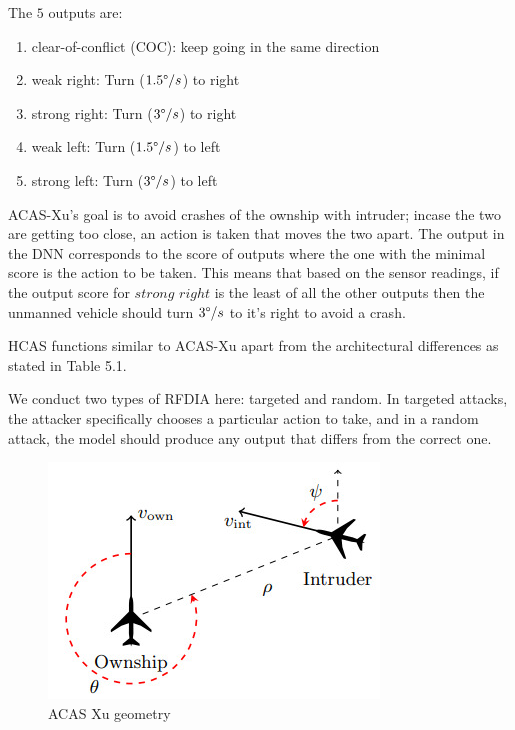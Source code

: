 The $5$ outputs are:
\begin{enumerate}
		\item clear-of-conflict (COC): keep going in the same direction
	\item weak right: Turn ($1.5\degree /s$) to right
	\item strong right:  Turn  ($3 \degree /s$) to right
	\item weak left: Turn ($1.5\degree /s$) to left
	\item strong left: Turn ($3 \degree /s$) to left
\end{enumerate}

\ac{ACAS-Xu}'s goal is to avoid crashes of the ownship with intruder; incase the two are getting too close, an action is taken that moves the two apart. 
The output in the \ac{DNN} corresponds to the score of outputs where the one with the minimal score is the action to be taken. 
This means that based on the sensor readings, if the output score for $strong$ $right$ is the least of all the other outputs then the unmanned vehicle should turn $3 \degree /s$ to it's right to avoid a crash. 

\ac{HCAS} functions similar to \ac{ACAS-Xu} apart from the architectural differences as stated in Table 5.1. 


We conduct two types of \ac{RFDIA} here: targeted and random.
In targeted attacks, the attacker specifically chooses a particular action to take, and in a random attack, the model should produce any output that differs from the correct one. 



\begin{figure}
	\centering
	\includegraphics[width=0.7\linewidth]{Images/ACASXugeometry}
	\caption[ACAS Xu]{ACAS Xu geometry}
	\label{fig:acasxugeometry}
\end{figure}



